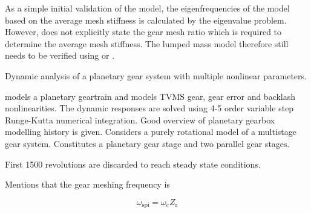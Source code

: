 As a simple initial validation of the model, the eigenfrequencies of the model based on the average mesh stiffness is calculated by the eigenvalue problem. However, \cite{Chaari2006} does not explicitly state the gear mesh ratio which is required to determine the average mesh stiffness. The lumped mass model therefore still needs to be verified using \cite{Chaari2006} or \cite{Lin1999}.


\cite{Xiang2017} Dynamic analysis of a planetary gear system with multiple nonlinear parameters.

\cite{Xiang2017} models a planetary geartrain and models TVMS gear, gear error and backlash nonlinearities. The dynamic responses are solved using 4-5 order variable step Runge-Kutta numerical integration. Good overview of planetary gearbox modelling history is given. Considers a purely rotational model of a multistage gear system. Constitutes a planetary gear stage and two parallel gear stages.

First 1500 revolutions are discarded to reach steady state conditions.

Mentions that the gear meshing frequency is 

\begin{equation}
	\omega_{\mathrm{spi}}=\omega_{\mathrm{c}} Z_{\mathrm{r}}
\end{equation}



